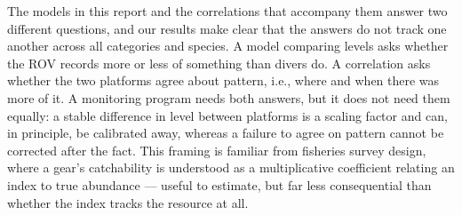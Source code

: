 \documentclass[11pt]{article}
\begin{document}
The models in this report and the correlations that accompany them answer two
different questions, and our results make clear that the answers do not track
one another across all categories and species.
A model comparing levels asks whether the ROV records more or less of
something than divers do.
A correlation asks whether the two platforms agree about pattern, i.e., where 
and when there was more of it.
A monitoring program needs both answers, but it does not need them equally: a
stable difference in level between platforms is a scaling factor and can, in
principle, be calibrated away, whereas a failure to agree on pattern cannot be
corrected after the fact.
This framing is familiar from fisheries survey design, where a gear's
catchability is understood as a multiplicative coefficient relating an index
to true abundance --- useful to estimate, but far less consequential than
whether the index tracks the resource at all.
\end{document}
